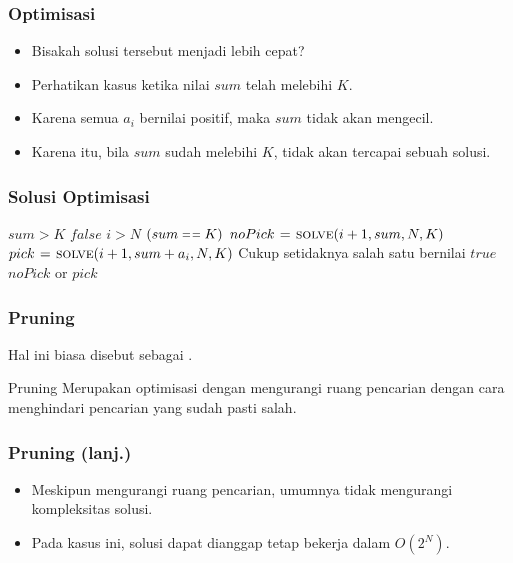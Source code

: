 \begin{frame}
\frametitle{Optimisasi}
\begin{itemize}
  \item Bisakah solusi tersebut menjadi lebih cepat?
  \item Perhatikan kasus ketika nilai $sum$ telah melebihi $K$.
  \item Karena semua $a_i$ bernilai positif, maka $sum$ tidak akan mengecil.
  \item Karena itu, bila $sum$ sudah melebihi $K$,  tidak akan tercapai sebuah solusi.
\end{itemize}
\end{frame}

\begin{frame}
\frametitle{Solusi Optimisasi}
\begin{codebox}
\li \If $sum > K$ \Then
\li   \Return $false$
    \End
\zi
\li \If $i > N$ \Then
\li   \Return $(sum \isequal K)$
\li \Else 
\li   $noPick \mathrel{\hspace{1pt}=\hspace{1pt}} \textnormal{\scshape solve}(i+1, sum, N, K)$
\li   $pick \mathrel{\hspace{1pt}=\hspace{1pt}} \textnormal{\scshape solve}(i+1, sum + a_i, N, K)$
\li   \Comment Cukup setidaknya salah satu bernilai $true$
\li   \Return $noPick$ or $pick$
    \End
\end{codebox}
\end{frame}

\begin{frame}
\frametitle{Pruning}
Hal ini biasa disebut sebagai .
\begin{block}{Pruning}
  Merupakan optimisasi dengan mengurangi ruang pencarian dengan cara menghindari pencarian yang sudah pasti salah.
\end{block}
\end{frame}

\begin{frame}
\frametitle{Pruning (lanj.)}
\begin{itemize}
  \item Meskipun mengurangi ruang pencarian, \fpruning umumnya tidak mengurangi kompleksitas solusi.
  \item Pada kasus ini, solusi dapat dianggap tetap bekerja dalam $O(2^N)$.
\end{itemize}
\end{frame}

